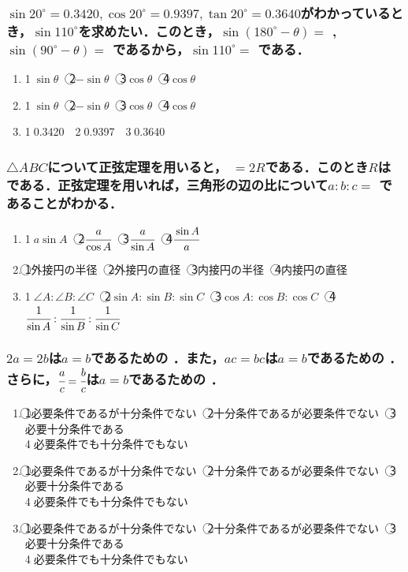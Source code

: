 \documentclass[onecolumn,10pt]{jarticle}
\newcommand{\ctext}[1]{\textcircled{\scriptsize #1}}
\begin{document}
\subsubsection{$\sin20^\circ=0.3420, \cos20^\circ=0.9397, \tan20^\circ=0.3640$がわかっているとき，$\sin110^\circ$を求めたい．このとき，$\sin(180^\circ-\theta)=$  , $\sin(90^\circ-\theta)=$  であるから，$\sin110^\circ=$  である．}
\begin{enumerate}[(1)]
    \item \ctext{1}$\sin\theta$　\ctext{2}$-\sin\theta$　\ctext{3}$\cos\theta$　\ctext{4}$\cos\theta$
    \item \ctext{1}$\sin\theta$　\ctext{2}$-\sin\theta$　\ctext{3}$\cos\theta$　\ctext{4}$\cos\theta$
    \item \ctext{1}0.3420　\ctext{2}0.9397　\ctext{3}0.3640
\end{enumerate}

\subsubsection{$\triangle{ABC}$について正弦定理を用いると，  $=2R$である．このとき$R$は  である．正弦定理を用いれば，三角形の辺の比について$a:b:c=$  であることがわかる．}
\begin{enumerate}[(1)]
    \item \ctext{1}$a\sin A$　\ctext{2}$\cfrac{a}{\cos A}$　\ctext{3}$\cfrac{a}{\sin A}$　\ctext{4}$\cfrac{\sin A}{a}$
    \item \ctext{1}外接円の半径　\ctext{2}外接円の直径　\ctext{3}内接円の半径　\ctext{4}内接円の直径
    \item \ctext{1}$\angle A:\angle B:\angle C$　\ctext{2}$\sin A:\sin B:\sin C$　\ctext{3}$\cos A:\cos B: \cos C$　\ctext{4}$\cfrac{1}{\sin A}:\cfrac{1}{\sin B}:\cfrac{1}{\sin C}$
\end{enumerate}

\newpage

\subsubsection{$2a=2b$は$a=b$であるための  ．また，$ac=bc$は$a=b$であるための  ．さらに，$\cfrac{a}{c}=\cfrac{b}{c}$は$a=b$であるための  ．}
\begin{enumerate}[(1)]
    \item \ctext{1}必要条件であるが十分条件でない　\ctext{2}十分条件であるが必要条件でない　\ctext{3}必要十分条件である\\\ctext{4}必要条件でも十分条件でもない
    \item \ctext{1}必要条件であるが十分条件でない　\ctext{2}十分条件であるが必要条件でない　\ctext{3}必要十分条件である\\\ctext{4}必要条件でも十分条件でもない
    \item \ctext{1}必要条件であるが十分条件でない　\ctext{2}十分条件であるが必要条件でない　\ctext{3}必要十分条件である\\\ctext{4}必要条件でも十分条件でもない
\end{enumerate}
\end{document}
